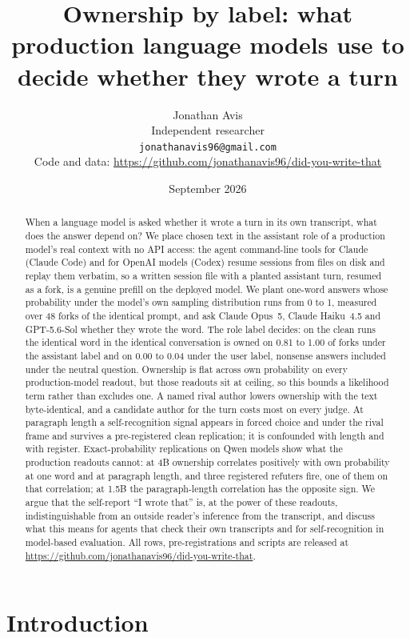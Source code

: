 \documentclass[twocolumn,10pt]{article}
\title{Ownership by label: what production language models use to decide whether they wrote a turn}
\author{Jonathan Avis\\Independent researcher\\\texttt{jonathanavis96@gmail.com}\\[2pt]\small Code and data: \url{https://github.com/jonathanavis96/did-you-write-that}}
\date{September 2026}
\newcommand{\opus}{Claude Opus~5}
\newcommand{\haiku}{Claude Haiku~4.5}
\newcommand{\gpt}{GPT-5.6-Sol}
\begin{document}
\maketitle

\begin{abstract}
When a language model is asked whether it wrote a turn in its own transcript, what does the answer depend on? We place chosen text in the assistant role of a production model's real context with no API access: the agent command-line tools for Claude (Claude Code) and for OpenAI models (Codex) resume sessions from files on disk and replay them verbatim, so a written session file with a planted assistant turn, resumed as a fork, is a genuine prefill on the deployed model. We plant one-word answers whose probability under the model's own sampling distribution runs from 0 to 1, measured over 48 forks of the identical prompt, and ask \opus{}, \haiku{} and \gpt{} whether they wrote the word. The role label decides: on the clean runs the identical word in the identical conversation is owned on 0.81 to 1.00 of forks under the assistant label and on 0.00 to 0.04 under the user label, nonsense answers included under the neutral question. Ownership is flat across own probability on every production-model readout, but those readouts sit at ceiling, so this bounds a likelihood term rather than excludes one. A named rival author lowers ownership with the text byte-identical, and a candidate author for the turn costs most on every judge. At paragraph length a self-recognition signal appears in forced choice and under the rival frame and survives a pre-registered clean replication; it is confounded with length and with register. Exact-probability replications on Qwen models show what the production readouts cannot: at 4B ownership correlates positively with own probability at one word and at paragraph length, and three registered refuters fire, one of them on that correlation; at 1.5B the paragraph-length correlation has the opposite sign. We argue that the self-report ``I wrote that'' is, at the power of these readouts, indistinguishable from an outside reader's inference from the transcript, and discuss what this means for agents that check their own transcripts and for self-recognition in model-based evaluation. All rows, pre-registrations and scripts are released at \url{https://github.com/jonathanavis96/did-you-write-that}.
\end{abstract}

\section{Introduction}
\end{document}
